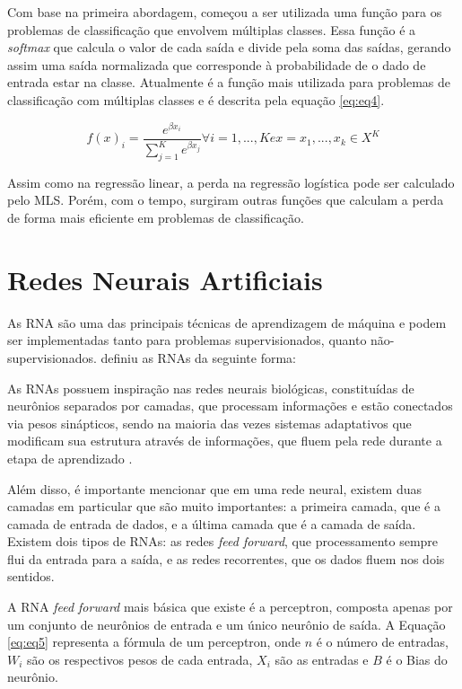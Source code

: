 Com base na primeira abordagem, começou a ser utilizada uma função para os problemas de classificação que envolvem múltiplas classes. Essa função é a \textit{softmax} que calcula o valor de cada saída e divide pela soma das saídas, gerando assim uma saída normalizada que corresponde à probabilidade de o dado de entrada estar na classe. Atualmente é a função mais utilizada para problemas de classificação com múltiplas classes e é descrita pela equação \ref{eq:eq4}.

\begin{equation}
\label{eq:eq4}
	f(x)_i = \dfrac{e^{\beta x_i}}{\sum_{j = 1}^{K}e^{\beta x_j}} \forall i = 1,...,K e x = {x_1, ... ,x_k} \in X^K
\end{equation}

Assim como na regressão linear, a perda na regressão logística pode ser calculado pelo \ac{MLS}. Porém, com o tempo, surgiram outras funções que calculam a perda de forma mais eficiente em problemas de classificação.

\section{Redes Neurais Artificiais}
\label{secao:2:2}

As \ac{RNA} são uma das principais técnicas de aprendizagem de máquina e podem ser implementadas tanto para problemas supervisionados, quanto não-supervisionados.  definiu as \ac{RNA}s da seguinte forma:

\begin{citacao}
	As \ac{RNA}s possuem inspiração nas redes neurais biológicas, constituídas de neurônios separados por camadas, que processam informações e estão conectados via pesos sinápticos, sendo na maioria das vezes sistemas adaptativos que modificam sua estrutura através de informações, que fluem pela rede durante a etapa de aprendizado \cite{jost-2015}.
\end{citacao}

Além disso, é importante mencionar que em uma rede neural, existem duas camadas em particular que são muito importantes: a primeira camada, que é a camada de entrada de dados, e a última camada que é a camada de saída. Existem dois tipos de \ac{RNA}s: as redes \textit{feed forward}, que processamento sempre flui da entrada para a saída, e as redes recorrentes, que os dados fluem nos dois sentidos.

A \ac{RNA} \textit{feed forward} mais básica que existe é a perceptron, composta apenas por um conjunto de neurônios de entrada e um único neurônio de saída. A Equação \ref{eq:eq5} representa a fórmula de um perceptron, onde $n$ é o número de entradas, $W_i$ são os respectivos pesos de cada entrada, $X_i$ são as entradas e $B$ é o Bias do neurônio.

